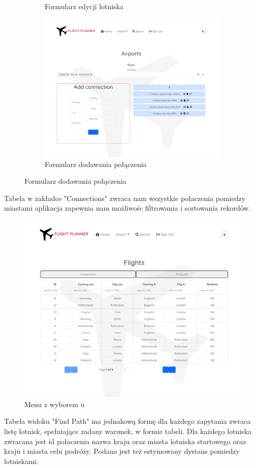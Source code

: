 \documentclass[12pt]{article}
\begin{document}
\begin{figure}[!ht]
\begin{subfigure}{.45\textwidth}
        \caption{Formularz edycji lotniska}
    \end{subfigure}
    \begin{subfigure}{.45\textwidth}
        \centering
        \includegraphics[width=0.95\linewidth]{6}  
        \caption{Formularz dodawania połączenia}
    \end{subfigure}
\end{figure}
\newpage
Tabela w zakładce "Connections" zwraca nam wszystkie połaczenia pomiedzy miastami aplikacja zapewnia nam możliwośc filtrowania i sortowania rekordów.\\
\begin{figure}[!ht]
    \centering
    \includegraphics[width=0.55\linewidth]{7}  
    \caption{Menu z wyborem u}
\end{figure}
Tabela widoku "Find Path" ma jednakową formę dla każdego zapytania zwraca listę lotnisk, spełniające zadany warunek, w formie tabeli. Dla każdego lotniska zwracana jest id połaczenia nazwa kraju oraz miasta lotniska startowego oraz kraju i miasta celu podróży. Podana jest też estymowany dystans pomiedzy lotniskami.
\end{document}
